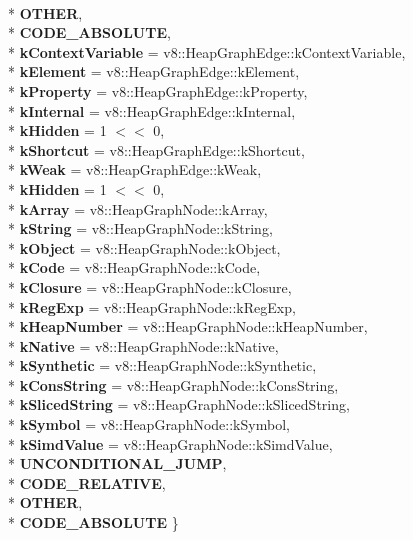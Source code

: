 \begin{DoxyCompactItemize}
\\*
{\bfseries O\+T\+H\+ER}, 
\\*
{\bfseries C\+O\+D\+E\+\_\+\+A\+B\+S\+O\+L\+U\+TE}, 
\\*
{\bfseries k\+Context\+Variable} = v8\+:\+:Heap\+Graph\+Edge\+:\+:k\+Context\+Variable, 
\\*
{\bfseries k\+Element} = v8\+:\+:Heap\+Graph\+Edge\+:\+:k\+Element, 
\\*
{\bfseries k\+Property} = v8\+:\+:Heap\+Graph\+Edge\+:\+:k\+Property, 
\\*
{\bfseries k\+Internal} = v8\+:\+:Heap\+Graph\+Edge\+:\+:k\+Internal, 
\\*
{\bfseries k\+Hidden} = 1 $<$$<$ 0, 
\\*
{\bfseries k\+Shortcut} = v8\+:\+:Heap\+Graph\+Edge\+:\+:k\+Shortcut, 
\\*
{\bfseries k\+Weak} = v8\+:\+:Heap\+Graph\+Edge\+:\+:k\+Weak, 
\\*
{\bfseries k\+Hidden} = 1 $<$$<$ 0, 
\\*
{\bfseries k\+Array} = v8\+:\+:Heap\+Graph\+Node\+:\+:k\+Array, 
\\*
{\bfseries k\+String} = v8\+:\+:Heap\+Graph\+Node\+:\+:k\+String, 
\\*
{\bfseries k\+Object} = v8\+:\+:Heap\+Graph\+Node\+:\+:k\+Object, 
\\*
{\bfseries k\+Code} = v8\+:\+:Heap\+Graph\+Node\+:\+:k\+Code, 
\\*
{\bfseries k\+Closure} = v8\+:\+:Heap\+Graph\+Node\+:\+:k\+Closure, 
\\*
{\bfseries k\+Reg\+Exp} = v8\+:\+:Heap\+Graph\+Node\+:\+:k\+Reg\+Exp, 
\\*
{\bfseries k\+Heap\+Number} = v8\+:\+:Heap\+Graph\+Node\+:\+:k\+Heap\+Number, 
\\*
{\bfseries k\+Native} = v8\+:\+:Heap\+Graph\+Node\+:\+:k\+Native, 
\\*
{\bfseries k\+Synthetic} = v8\+:\+:Heap\+Graph\+Node\+:\+:k\+Synthetic, 
\\*
{\bfseries k\+Cons\+String} = v8\+:\+:Heap\+Graph\+Node\+:\+:k\+Cons\+String, 
\\*
{\bfseries k\+Sliced\+String} = v8\+:\+:Heap\+Graph\+Node\+:\+:k\+Sliced\+String, 
\\*
{\bfseries k\+Symbol} = v8\+:\+:Heap\+Graph\+Node\+:\+:k\+Symbol, 
\\*
{\bfseries k\+Simd\+Value} = v8\+:\+:Heap\+Graph\+Node\+:\+:k\+Simd\+Value, 
\\*
{\bfseries U\+N\+C\+O\+N\+D\+I\+T\+I\+O\+N\+A\+L\+\_\+\+J\+U\+MP}, 
\\*
{\bfseries C\+O\+D\+E\+\_\+\+R\+E\+L\+A\+T\+I\+VE}, 
\\*
{\bfseries O\+T\+H\+ER}, 
\\*
{\bfseries C\+O\+D\+E\+\_\+\+A\+B\+S\+O\+L\+U\+TE}
 \}\hypertarget{classv8_1_1internal_1_1_b_a_s_e___e_m_b_e_d_d_e_d_a86d4e2d8815ac6f9c09a8ff25971ffb9}{}\label{classv8_1_1internal_1_1_b_a_s_e___e_m_b_e_d_d_e_d_a86d4e2d8815ac6f9c09a8ff25971ffb9}


\end{DoxyCompactItemize}
